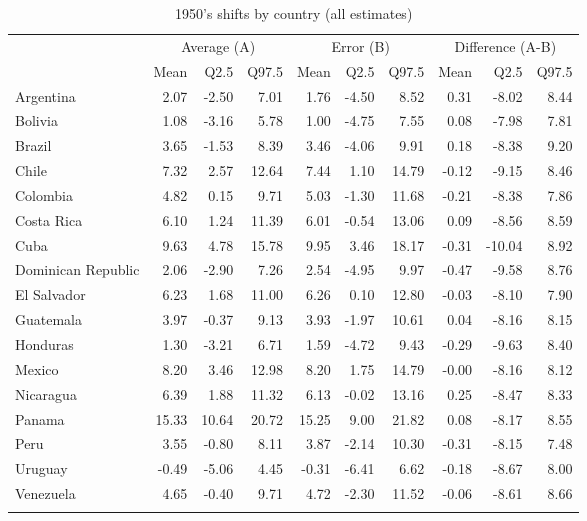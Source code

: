 \renewcommand{\arraystretch}{1.2}
\setlength{\tabcolsep}{10pt}
\begin{table}[htp]
\centering
\caption{1950's shifts by country (all estimates)}
\label{tab:fshift_1950}
\scriptsize
\begin{tabular}{lrrrrrrrrr}
\hline
\addlinespace
& \multicolumn{3}{c}{Average (A)}  & \multicolumn{3}{c}{Error (B)} & \multicolumn{3}{c}{Difference (A-B)}  \\
\cmidrule(lr){2-4}\cmidrule(lr){5-7}\cmidrule(lr){8-10}
& Mean & Q2.5 & Q97.5 & Mean & Q2.5 & Q97.5 & Mean & Q2.5 & Q97.5 \\
\addlinespace
\hline
\addlinespace 
Argentina & 2.07 & -2.50 & 7.01 & 1.76 & -4.50 & 8.52 & 0.31 & -8.02 & 8.44 \\ 
  Bolivia & 1.08 & -3.16 & 5.78 & 1.00 & -4.75 & 7.55 & 0.08 & -7.98 & 7.81 \\ 
  Brazil & 3.65 & -1.53 & 8.39 & 3.46 & -4.06 & 9.91 & 0.18 & -8.38 & 9.20 \\ 
  Chile & 7.32 & 2.57 & 12.64 & 7.44 & 1.10 & 14.79 & -0.12 & -9.15 & 8.46 \\ 
  Colombia & 4.82 & 0.15 & 9.71 & 5.03 & -1.30 & 11.68 & -0.21 & -8.38 & 7.86 \\ 
  Costa Rica & 6.10 & 1.24 & 11.39 & 6.01 & -0.54 & 13.06 & 0.09 & -8.56 & 8.59 \\ 
  Cuba & 9.63 & 4.78 & 15.78 & 9.95 & 3.46 & 18.17 & -0.31 & -10.04 & 8.92 \\ 
  Dominican Republic & 2.06 & -2.90 & 7.26 & 2.54 & -4.95 & 9.97 & -0.47 & -9.58 & 8.76 \\ 
  El Salvador & 6.23 & 1.68 & 11.00 & 6.26 & 0.10 & 12.80 & -0.03 & -8.10 & 7.90 \\ 
  Guatemala & 3.97 & -0.37 & 9.13 & 3.93 & -1.97 & 10.61 & 0.04 & -8.16 & 8.15 \\ 
  Honduras & 1.30 & -3.21 & 6.71 & 1.59 & -4.72 & 9.43 & -0.29 & -9.63 & 8.40 \\ 
  Mexico & 8.20 & 3.46 & 12.98 & 8.20 & 1.75 & 14.79 & -0.00 & -8.16 & 8.12 \\ 
  Nicaragua & 6.39 & 1.88 & 11.32 & 6.13 & -0.02 & 13.16 & 0.25 & -8.47 & 8.33 \\ 
  Panama & 15.33 & 10.64 & 20.72 & 15.25 & 9.00 & 21.82 & 0.08 & -8.17 & 8.55 \\ 
  Peru & 3.55 & -0.80 & 8.11 & 3.87 & -2.14 & 10.30 & -0.31 & -8.15 & 7.48 \\ 
  Uruguay & -0.49 & -5.06 & 4.45 & -0.31 & -6.41 & 6.62 & -0.18 & -8.67 & 8.00 \\ 
  Venezuela & 4.65 & -0.40 & 9.71 & 4.72 & -2.30 & 11.52 & -0.06 & -8.61 & 8.66 \\ 
    \addlinespace
\hline
\end{tabular}
\end{table}
